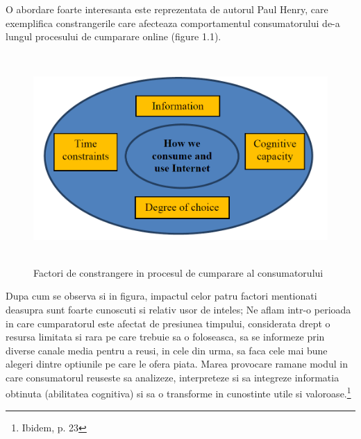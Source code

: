 \documentclass[a4paper, 12pt]{article}
\begin{document}
	\quad O abordare foarte interesanta este reprezentata de autorul Paul Henry, care exemplifica constrangerile care afecteaza comportamentul consumatorului de-a lungul procesului de cumparare online (figure 1.1).
	\begin{figure}[!htb]
		\centering
		\includegraphics[width=13cm, height=8cm]{"figures/first.png"}
		\caption{Factori de constrangere in procesul de cumparare al consumatorului}\label{fig:first}
	\end{figure}

	\quad Dupa cum se observa si in figura, impactul celor patru factori mentionati deasupra sunt foarte cunoscuti si relativ usor de inteles; Ne aflam intr-o perioada in care cumparatorul este afectat de presiunea timpului, considerata drept o resursa limitata si rara pe care trebuie sa o foloseasca, sa se informeze prin diverse canale media pentru a reusi, in cele din urma, sa faca cele mai bune alegeri dintre optiunile pe care le ofera piata. Marea provocare ramane modul in care consumatorul reuseste sa analizeze, interpreteze si sa integreze informatia obtinuta (abilitatea cognitiva) si sa o transforme in cunostinte utile si valoroase.\footnote{Ibidem, p. 23}
	
\end{document}
